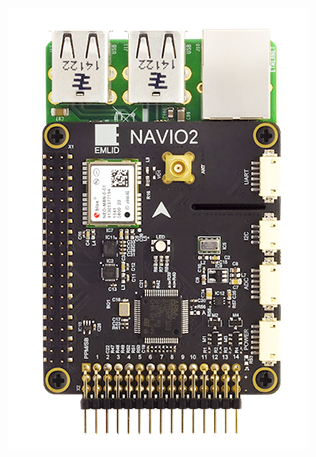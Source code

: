 \begin{itemize}
    
    \begin{figure}[ht]
        \centering
        \begin{subfigure}[b]{0.3\textwidth}
            \centering
            \includegraphics[angle=90,width=\textwidth]{images/navio2_rpi3.png}

\end{subfigure}
\end{figure}
\end{itemize}
